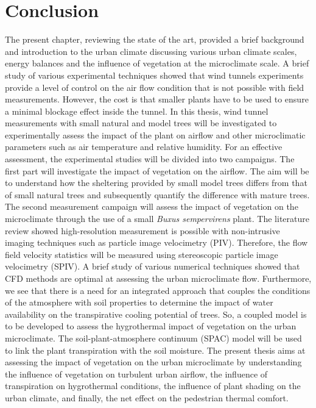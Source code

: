 \section{Conclusion}

The present chapter, reviewing the state of the art, provided a brief background and introduction to the urban climate discussing various urban climate scales, energy balances and the influence of vegetation at the microclimate scale. A brief study of various experimental techniques showed that wind tunnels experiments provide a level of control on the air flow condition that is not possible with field measurements. However, the cost is that smaller plants have to be used to ensure a minimal blockage effect inside the tunnel. In this thesis, wind tunnel measurements with small natural and model trees will be investigated to experimentally assess the impact of the plant on airflow and other microclimatic parameters such as air temperature and relative humidity. For an effective assessment, the experimental studies will be divided into two campaigns. The first part will investigate the impact of vegetation on the airflow. The aim will be to understand how the sheltering provided by small model trees differs from that of small natural trees and subsequently quantify the difference with mature trees. The second measurement campaign will assess the impact of vegetation on the microclimate through the use of a small \textit{Buxus sempervirens} plant. The literature review showed high-resolution measurement is possible with non-intrusive imaging techniques such as particle image velocimetry (PIV). Therefore, the flow field velocity statistics will be measured using stereoscopic particle image velocimetry (SPIV). A brief study of various numerical techniques showed that CFD methods are optimal at assessing the urban microclimate flow. Furthermore, we see that there is a need for an integrated approach that couples the conditions of the atmosphere with soil properties to determine the impact of water availability on the transpirative cooling potential of trees. So, a coupled model is to be developed to assess the hygrothermal impact of vegetation on the urban microclimate. The soil-plant-atmosphere continuum (SPAC) model will be used to link the plant transpiration with the soil moisture. The present thesis aims at assessing the impact of vegetation on the urban microclimate by understanding the influence of vegetation on turbulent urban airflow, the influence of transpiration on hygrothermal conditions, the influence of plant shading on the urban climate, and finally, the net effect on the pedestrian thermal comfort.